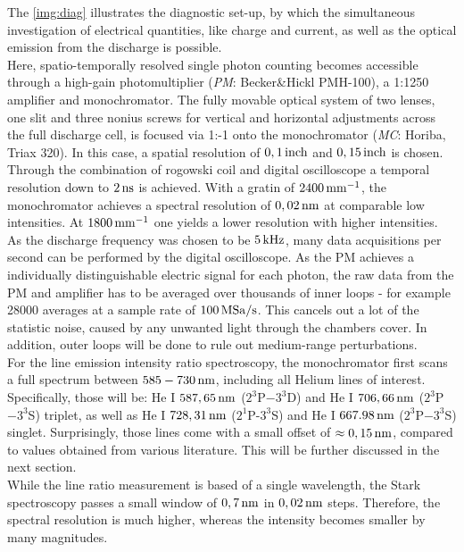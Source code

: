 \documentclass[a4paper,10pt,twoside]{article}
\newcommand{\tilt}[1]{\textit{#1}}
\begin{document}
			The \autoref{img:diag} illustrates the diagnostic set-up, by which the simultaneous investigation of electrical quantities, like charge and current, as well as the optical emission from the discharge is possible.\\			Here, spatio-temporally resolved single photon counting becomes accessible through a high-gain photomultiplier (\tilt{PM}: Becker\&Hickl PMH-100), a 1:1250 amplifier and monochromator. The fully movable optical system of two lenses, one slit and three nonius screws for vertical and horizontal adjustments across the full discharge cell, is focused via 1:-1 onto the monochromator (\tilt{MC}: Horiba, Triax 320). In this case, a spatial resolution of $\unit[0,1]{inch}$ and $\unit[0,15]{inch}$ is chosen. Through the combination of rogowski coil and digital oscilloscope a temporal resolution down to $\unit[2]{ns}$ is achieved. With a gratin of $\unit[2400]{mm^{-1}}$, the monochromator achieves a spectral resolution of $\unit[0,02]{nm}$ at comparable low intensities. At $\unit[1800]{mm^{-1}}$ one yields a lower resolution with higher intensities.\\
			As the discharge frequency was chosen to be $\unit[5]{kHz}$, many data acquisitions per second can be performed by the digital oscilloscope. As the PM achieves a individually distinguishable electric signal for each photon, the raw data from the PM and amplifier has to be averaged over thousands of inner loops - for example 28000 averages at a sample rate of $\unit[100]{MSa/s}$. This cancels out a lot of the statistic noise, caused by any unwanted light through the chambers cover. In addition, outer loops will be done to rule out medium-range perturbations.\\
			For the line emission intensity ratio spectroscopy, the monochromator first scans a full spectrum between $\unit[585-730]{nm}$, including all Helium lines of interest. Specifically, those will be: He I $\unit[587,65]{nm}$ ($2^3$P$-3^3$D) and He I $\unit[706,66]{nm}$ ($2^3$P$-3^3$S) triplet, as well as He I $\unit[728,31]{nm}$ ($2^1$P-$3^3$S) and He I $\unit[667.98]{nm}$ ($2^3$P$-3^3$S) singlet. Surprisingly, those lines come with a small offset of $\approx\unit[0,15]{nm}$, compared to values obtained from various literature. This will be further discussed in the next section.\\
			While the line ratio measurement is based of a single wavelength, the Stark spectroscopy passes a small window of $\unit[0,7]{nm}$ in $\unit[0,02]{nm}$ steps. Therefore, the spectral resolution is much higher, whereas the intensity becomes smaller by many magnitudes.\\
\end{document}
